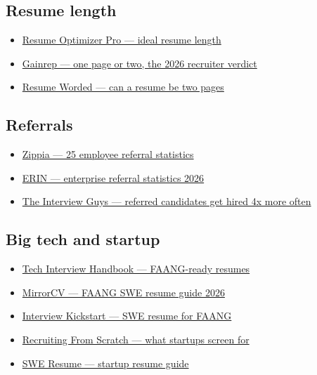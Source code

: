 \documentclass[11pt,a4paper]{article}
\begin{document}
\subsection*{Resume length}
\begin{itemize}\setlength\itemsep{1pt}
  \item \href{https://resumeoptimizerpro.com/blog/ideal-resume-length}{Resume Optimizer Pro --- ideal resume length}
  \item \href{https://www.gainrep.com/resources/one-page-resume-or-two/}{Gainrep --- one page or two, the 2026 recruiter verdict}
  \item \href{https://resumeworded.com/can-a-resume-be-two-pages-key-advice}{Resume Worded --- can a resume be two pages}
\end{itemize}

\subsection*{Referrals}
\begin{itemize}\setlength\itemsep{1pt}
  \item \href{https://www.zippia.com/advice/employee-referral-statistics/}{Zippia --- 25 employee referral statistics}
  \item \href{https://erinapp.com/blog/enterprise-employee-referral-statistics-you-need-to-know-for-2026/}{ERIN --- enterprise referral statistics 2026}
  \item \href{https://blog.theinterviewguys.com/referred-candidates-get-hired-4x-more-often-so-stop-asking-for-a/}{The Interview Guys --- referred candidates get hired 4x more often}
\end{itemize}

\subsection*{Big tech and startup}
\begin{itemize}\setlength\itemsep{1pt}
  \item \href{https://www.techinterviewhandbook.org/resume/}{Tech Interview Handbook --- FAANG-ready resumes}
  \item \href{https://mirrorcv.com/resume-guide/software-engineer-faang}{MirrorCV --- FAANG SWE resume guide 2026}
  \item \href{https://interviewkickstart.com/blogs/articles/software-engineer-resume-for-faang-companies}{Interview Kickstart --- SWE resume for FAANG}
  \item \href{https://www.recruitingfromscratch.com/blog/how-to-get-a-founding-engineer-job}{Recruiting From Scratch --- what startups screen for}
  \item \href{https://www.sweresume.app/articles/startup-resume-guide/}{SWE Resume --- startup resume guide}
\end{itemize}
\end{document}
